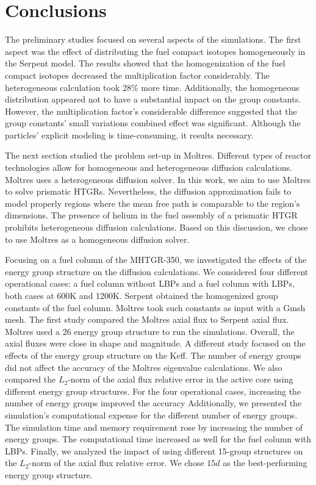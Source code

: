 \documentclass[11pt,letterpaper]{article}
\begin{document}
\section{Conclusions}

The preliminary studies focused on several aspects of the simulations.
The first aspect was the effect of distributing the fuel compact isotopes homogeneously in the Serpent model.
The results showed that the homogenization of the fuel compact isotopes decreased the multiplication factor considerably.
The heterogeneous calculation took 28$\%$ more time.
Additionally, the homogeneous distribution appeared not to have a substantial impact on the group constants.
However, the multiplication factor's considerable difference suggested that the group constants’ small variations combined effect was significant.
Although the particles’ explicit modeling is time-consuming, it results necessary.

The next section studied the problem set-up in Moltres.
Different types of reactor technologies allow for homogeneous and heterogeneous diffusion calculations.
Moltres uses a heterogeneous diffusion solver.
In this work, we aim to use Moltres to solve prismatic HTGRs.
Nevertheless, the diffusion approximation fails to model properly regions where the mean free path is comparable to the region's dimensions.
The presence of helium in the fuel assembly of a prismatic \gls{HTGR} prohibits heterogeneous diffusion calculations.
Based on this discussion, we chose to use Moltres as a homogeneous diffusion solver.

Focusing on a fuel column of the MHTGR-350, we investigated the effects of the energy group structure on the diffusion calculations.
We considered four different operational cases: a fuel column without LBPs and a fuel column with LBPs, both cases at 600K and 1200K.
Serpent obtained the homogenized group constants of the fuel column.
Moltres took such constants as input with a Gmsh mesh.
The first study compared the Moltres axial flux to Serpent axial flux.
Moltres used a 26 energy group structure to run the simulations.
Overall, the axial fluxes were close in shape and magnitude.
A different study focused on the effects of the energy group structure on the \gls{Keff}.
The number of energy groups did not affect the accuracy of the Moltres eigenvalue calculations.
We also compared the $L_2$-norm of the axial flux relative error in the active core using different energy group structures.
For the four operational cases, increasing the number of energy groups improved the accuracy
Additionally, we presented the simulation's computational expense for the different number of energy groups.
The simulation time and memory requirement rose by increasing the number of energy groups.
The computational time increased as well for the fuel column with LBPs.
Finally, we analyzed the impact of using different 15-group structures on the $L_2$-norm of the axial flux relative error.
We chose $15d$ as the best-performing energy group structure.
\end{document}
